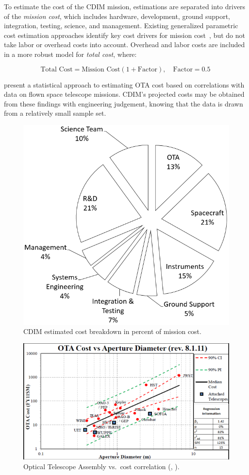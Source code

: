 \documentclass{ws-jai}
\begin{document}
To estimate the cost of the CDIM mission, estimations are separated into drivers of the \emph{mission cost}, which includes hardware, development, ground support, integration, testing, science, and management.
Existing generalized parametric cost estimation approaches identify key cost drivers for mission cost~\cite{stahl2013,bely2011}, but do not take labor or overhead costs into account.
Overhead and labor costs are included in a more robust model for \emph{total cost}, where:

\begin{equation}
  	\text{Total Cost}=\text{Mission Cost} (1+\text{Factor}),\quad\text{Factor}=0.5\
\label{eq:total-cost}
\end{equation}

\begin{figure}
  \centering

\end{figure}

\citeauthor{stahl2013} present a statistical approach to estimating OTA cost based on correlations with data on flown space telescope missions.
CDIM's projected costs may be obtained from these findings with engineering judgement, knowing that the data is drawn from a relatively small sample set.

\begin{figure}
  \centering
    \centering
    \includegraphics[width=.4\linewidth]{figs/cost-breakdown-pie.png}
    \caption{CDIM estimated cost breakdown in percent of mission cost.
\label{fig:cost-breakdown}
}
\end{figure}
\begin{figure}
    \centering
    \includegraphics[width=.6\linewidth]{figs/ota_cost-diameter_stahl2010.png}
    \caption{Optical Telescope Assembly vs.\ cost correlation (\citeauthor{stahl2013}, \citeyear{stahl2013}).
\label{fig:cost-stahl-ota-cost-vs-diameter}
}
\end{figure}
\end{document}
